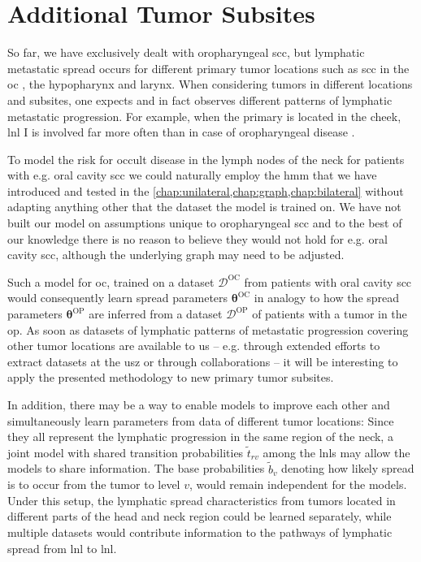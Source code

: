 \documentclass[\relativeRoot/main.tex]{subfiles}
\begin{document}
\section{Additional Tumor Subsites}
\label{sec:future:subsites}

So far, we have exclusively dealt with oropharyngeal \gls{scc}, but lymphatic metastatic spread occurs for different primary tumor locations such as \acrlong{scc} in the \gls{oc} \cite{shah_patterns_1990,razfar_incidence_2009,woolgar_topography_2007}, the hypopharynx and larynx. When considering tumors in different locations and subsites, one expects and in fact observes different patterns of lymphatic metastatic progression. For example, when the primary is located in the cheek, \gls{lnl} I is involved far more often than in case of oropharyngeal disease \cite{woolgar_topography_2007}.

To model the risk for occult disease in the lymph nodes of the neck for patients with e.g. oral cavity \gls{scc} we could naturally employ the \gls{hmm} that we have introduced and tested in the \cref{chap:unilateral,chap:graph,chap:bilateral} without adapting anything other that the dataset the model is trained on. We have not built our model on assumptions unique to oropharyngeal \gls{scc} and to the best of our knowledge there is no reason to believe they would not hold for e.g. oral cavity \gls{scc}, although the underlying graph may need to be adjusted.

Such a model for \gls{oc}, trained on a dataset $\boldsymbol{\mathcal{D}}^\text{OC}$ from patients with oral cavity \gls{scc} would consequently learn spread parameters $\boldsymbol{\theta}^\text{OC}$ in analogy to how the spread parameters $\boldsymbol{\theta}^\text{OP}$ are inferred from a dataset $\boldsymbol{\mathcal{D}}^\text{OP}$ of patients with a tumor in the \gls{op}. As soon as datasets of lymphatic patterns of metastatic progression covering other tumor locations are available to us -- e.g. through extended efforts to extract datasets at the \gls{usz} or through collaborations -- it will be interesting to apply the presented methodology to new primary tumor subsites.

In addition, there may be a way to enable models to improve each other and simultaneously learn parameters from data of different tumor locations: Since they all represent the lymphatic progression in the same region of the neck, a joint model with shared transition probabilities $\tilde{t}_{rv}$ among the \glspl{lnl} may allow the models to share information. The base probabilities $\tilde{b}_v$ denoting how likely spread is to occur from the tumor to level $v$, would remain independent for the models. Under this setup, the lymphatic spread characteristics from tumors located in different parts of the head and neck region could be learned separately, while multiple datasets would contribute information to the pathways of lymphatic spread from \gls{lnl} to \gls{lnl}.
\end{document}
